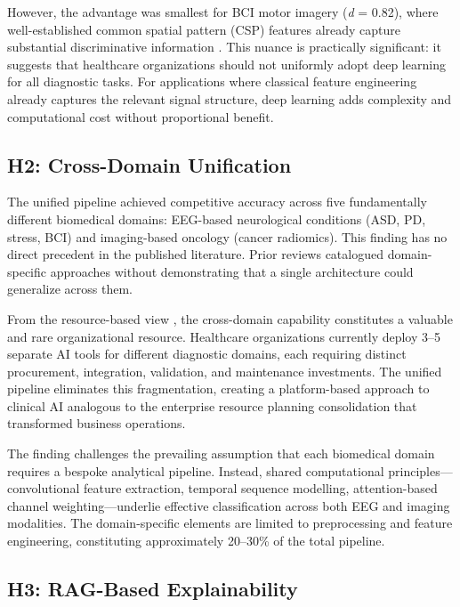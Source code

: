 However, the advantage was smallest for BCI motor imagery (\textit{d} = 0.82), where well-established common spatial pattern (CSP) features already capture substantial discriminative information \citep{pfurtscheller1999bci}. This nuance is practically significant: it suggests that healthcare organizations should not uniformly adopt deep learning for all diagnostic tasks. For applications where classical feature engineering already captures the relevant signal structure, deep learning adds complexity and computational cost without proportional benefit.

\subsection{H2: Cross-Domain Unification}

The unified pipeline achieved competitive accuracy across five fundamentally different biomedical domains: EEG-based neurological conditions (ASD, PD, stress, BCI) and imaging-based oncology (cancer radiomics). This finding has no direct precedent in the published literature. Prior reviews \citep{craik2019eeg, roy2019eeg} catalogued domain-specific approaches without demonstrating that a single architecture could generalize across them.

From the resource-based view \citep{barney1991firm}, the cross-domain capability constitutes a valuable and rare organizational resource. Healthcare organizations currently deploy 3--5 separate AI tools for different diagnostic domains, each requiring distinct procurement, integration, validation, and maintenance investments. The unified pipeline eliminates this fragmentation, creating a platform-based approach to clinical AI analogous to the enterprise resource planning consolidation that transformed business operations.

The finding challenges the prevailing assumption that each biomedical domain requires a bespoke analytical pipeline. Instead, shared computational principles---convolutional feature extraction, temporal sequence modelling, attention-based channel weighting---underlie effective classification across both EEG and imaging modalities. The domain-specific elements are limited to preprocessing and feature engineering, constituting approximately 20--30\% of the total pipeline.

\subsection{H3: RAG-Based Explainability}

